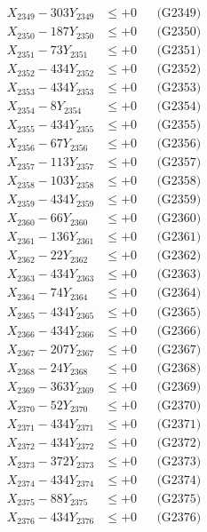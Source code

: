 \documentclass[a4paper,10pt]{article}
\begin{document}
{\begin{align}
X_{2349} - 303Y_{2349} &\leq +0 && \text{(G2349)} \\
X_{2350} - 187Y_{2350} &\leq +0 && \text{(G2350)} \\
\allowbreak
X_{2351} - 73Y_{2351} &\leq +0 && \text{(G2351)} \\
X_{2352} - 434Y_{2352} &\leq +0 && \text{(G2352)} \\
X_{2353} - 434Y_{2353} &\leq +0 && \text{(G2353)} \\
X_{2354} - 8Y_{2354} &\leq +0 && \text{(G2354)} \\
X_{2355} - 434Y_{2355} &\leq +0 && \text{(G2355)} \\
X_{2356} - 67Y_{2356} &\leq +0 && \text{(G2356)} \\
X_{2357} - 113Y_{2357} &\leq +0 && \text{(G2357)} \\
X_{2358} - 103Y_{2358} &\leq +0 && \text{(G2358)} \\
X_{2359} - 434Y_{2359} &\leq +0 && \text{(G2359)} \\
X_{2360} - 66Y_{2360} &\leq +0 && \text{(G2360)} \\
\allowbreak
X_{2361} - 136Y_{2361} &\leq +0 && \text{(G2361)} \\
X_{2362} - 22Y_{2362} &\leq +0 && \text{(G2362)} \\
X_{2363} - 434Y_{2363} &\leq +0 && \text{(G2363)} \\
X_{2364} - 74Y_{2364} &\leq +0 && \text{(G2364)} \\
X_{2365} - 434Y_{2365} &\leq +0 && \text{(G2365)} \\
X_{2366} - 434Y_{2366} &\leq +0 && \text{(G2366)} \\
X_{2367} - 207Y_{2367} &\leq +0 && \text{(G2367)} \\
X_{2368} - 24Y_{2368} &\leq +0 && \text{(G2368)} \\
X_{2369} - 363Y_{2369} &\leq +0 && \text{(G2369)} \\
X_{2370} - 52Y_{2370} &\leq +0 && \text{(G2370)} \\
\allowbreak
X_{2371} - 434Y_{2371} &\leq +0 && \text{(G2371)} \\
X_{2372} - 434Y_{2372} &\leq +0 && \text{(G2372)} \\
X_{2373} - 372Y_{2373} &\leq +0 && \text{(G2373)} \\
X_{2374} - 434Y_{2374} &\leq +0 && \text{(G2374)} \\
X_{2375} - 88Y_{2375} &\leq +0 && \text{(G2375)} \\
X_{2376} - 434Y_{2376} &\leq +0 && \text{(G2376)} \\

\end{align}}
\end{document}
